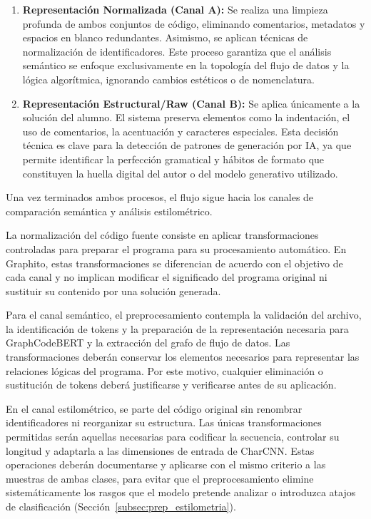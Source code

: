 \begin{enumerate}
	\item \textbf{Representación Normalizada (Canal A):} Se realiza una limpieza profunda de ambos conjuntos de código, eliminando comentarios, metadatos y espacios en blanco redundantes. Asimismo, se aplican técnicas de normalización de identificadores. Este proceso garantiza que el análisis semántico se enfoque exclusivamente en la topología del flujo de datos y la lógica algorítmica, ignorando cambios estéticos o de nomenclatura.
	\item \textbf{Representación Estructural/Raw (Canal B):} Se aplica únicamente a la solución del alumno. El sistema preserva elementos como la indentación, el uso de comentarios, la acentuación y caracteres especiales. Esta decisión técnica es clave para la detección de patrones de generación por IA, ya que permite identificar la perfección gramatical y hábitos de formato que constituyen la huella digital del autor o del modelo generativo utilizado.
\end{enumerate}

Una vez terminados ambos procesos, el flujo sigue hacia los canales de comparación semántica y análisis estilométrico.

La normalización del código fuente consiste en aplicar transformaciones controladas para preparar el programa para su procesamiento automático. En Graphito, estas transformaciones se diferencian de acuerdo con el objetivo de cada canal y no implican modificar el significado del programa original ni sustituir su contenido por una solución generada.

Para el canal semántico, el preprocesamiento contempla la validación del archivo, la identificación de tokens y la preparación de la representación necesaria para GraphCodeBERT y la extracción del grafo de flujo de datos. Las transformaciones deberán conservar los elementos necesarios para representar las relaciones lógicas del programa. Por este motivo, cualquier eliminación o sustitución de tokens deberá justificarse y verificarse antes de su aplicación.

En el canal estilométrico, se parte del código original sin renombrar identificadores ni reorganizar su estructura. Las únicas transformaciones permitidas serán aquellas necesarias para codificar la secuencia, controlar su longitud y adaptarla a las dimensiones de entrada de CharCNN. Estas operaciones deberán documentarse y aplicarse con el mismo criterio a las muestras de ambas clases, para evitar que el preprocesamiento elimine sistemáticamente los rasgos que el modelo pretende analizar o introduzca atajos de clasificación (Sección~\ref{subsec:prep_estilometria}).

